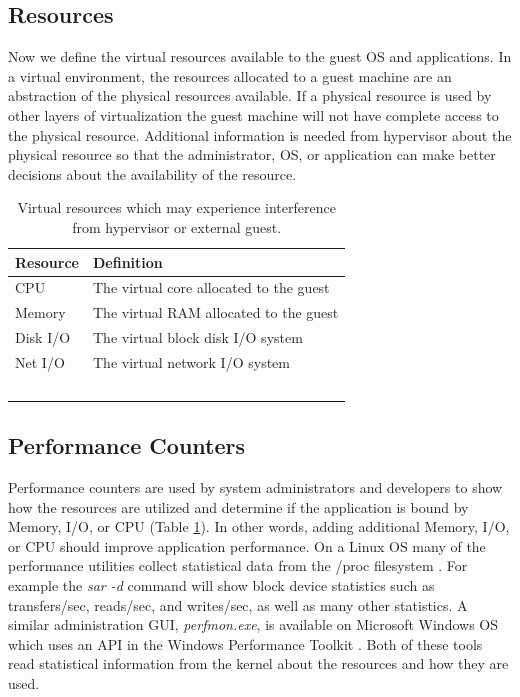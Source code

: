 \subsection{Resources}
Now we define the virtual resources available to the guest OS and applications.
In a virtual environment, the resources allocated to a guest machine are an abstraction of the physical resources available.  
If a physical resource is used by other layers of virtualization the guest machine will not have complete access to the physical resource.    
Additional information is needed from hypervisor about the physical resource so that the administrator, OS, or application can make better decisions about the availability of the resource. 

\begin{table}[h]
  \begin{tabular}{ l p{10cm} }
    Resource & Definition \\
    \hline
    CPU & The virtual core allocated to the guest \\
    Memory & The virtual RAM allocated to the guest \\
    Disk I/O & The virtual block disk I/O system \\
    Net I/O & The virtual network I/O system \\
    \hline
  \end{tabular}
\caption{Virtual resources which may experience interference from hypervisor or external guest.}
\label{tab:resources}
\end{table}

\subsection{Performance Counters}
Performance counters are used by system administrators and developers to show how the resources are utilized and determine if the application is bound by Memory, I/O, or CPU (Table \ref{tab:resources}).  
In other words, adding additional Memory, I/O, or CPU should improve application performance. 
On a Linux OS many of the performance utilities collect statistical data from the /proc filesystem \cite{proc}. 
For example the \emph{sar -d} command will show block device statistics such as transfers/sec, reads/sec, and writes/sec, as well as many other statistics.  
A similar administration GUI, \emph{perfmon.exe}, is available on Microsoft Windows OS which uses an API in the Windows Performance Toolkit \cite{winperf}.  Both of these tools read statistical information from the kernel about the resources and how they are used.

